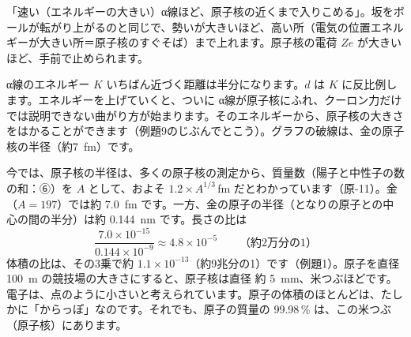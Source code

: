 \begin{phyomi}[$d=\dfrac{2Zke^2}{K}$]
「速い（エネルギーの大きい）α線ほど、原子核の近くまで入りこめる」。坂をボールが転がり上がるのと同じで、勢いが大きいほど、高い所（電気の位置エネルギーが大きい所＝原子核のすぐそば）まで上れます。原子核の電荷 $Ze$ が大きいほど、手前で止められます。
\end{phyomi}

\begin{phbaisuru}{α線のエネルギー $K$}
いちばん近づく距離は半分になります。$d$ は $K$ に反比例します。エネルギーを上げていくと、ついに α線が原子核にふれ、クーロン力だけでは説明できない曲がり方が始まります。そのエネルギーから、原子核の大きさをはかることができます（例題9のじぶんでとこう）。グラフの破線は、金の原子核の半径（約\qty{7}{fm}）です。
\par\smallskip\noindent{}
\end{phbaisuru}

\label{ph:原-1:hatena}今では、原子核の半径は、多くの原子核の測定から、質量数（陽子と中性子の数の和：⑥）を $A$ として、およそ $1.2\times A^{1/3}$\,fm だとわかっています（原-11）。金（$A=197$）では約 \qty{7.0}{fm} です。一方、金の原子の半径（となりの原子との中心の間の半分）は約 \qty{0.144}{nm} です。長さの比は
\[ \frac{7.0\times10^{-15}}{0.144\times10^{-9}}\approx4.8\times10^{-5}\qquad\text{（約2万分の1）} \]
体積の比は、その3乗で約 $1.1\times10^{-13}$（約9兆分の1）です（例題1）。原子を直径 \qty{100}{m} の競技場の大きさにすると、原子核は直径 約 \qty{5}{mm}、米つぶほどです。電子は、点のように小さいと考えられています。原子の体積のほとんどは、たしかに「からっぽ」なのです。それでも、原子の質量の 99.98\,\% は、この米つぶ（原子核）にあります。

